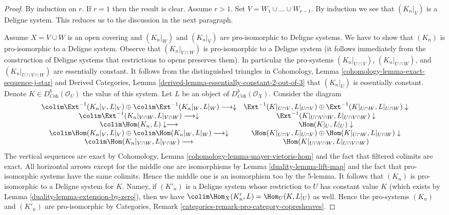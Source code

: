 \begin{proof}

By induction on $r$. If $r = 1$ then the result is clear.
Assume $r > 1$. Set $V = W_1 \cup \ldots \cup W_{r - 1}$.
By induction we see that $(K_n|_V)$ is a Deligne system.
This reduces us to the discussion in the next paragraph.

\medskip\noindent
Assume $X = V \cup W$ is an open covering and
$(K_n|_W)$ and $(K_n|_V)$ are pro-isomorphic to Deligne systems.
We have to show that $(K_n)$ is pro-isomorphic to a Deligne system.
Observe that $(K_n|_{V \cap W})$ is pro-isomorphic to a Deligne system
(it follows immediately from the construction of Deligne systems
that restrictions to opens preserves them). In particular the pro-systems
$(K_n|_{U \cap V})$,
$(K_n|_{U \cap W})$, and
$(K_n|_{U \cap V \cap W})$
are essentially constant. It follows from the distinguished triangles
in Cohomology, Lemma \ref{cohomology-lemma-exact-sequence-j-star} and
Derived Categories, Lemma \ref{derived-lemma-essentially-constant-2-out-of-3}
that $(K_n|_U)$ is essentially constant.
Denote $K \in D^b_{\textit{Coh}}(\mathcal{O}_U)$ the value of this system.
Let $L$ be an object of $D^b_{\textit{Coh}}(\mathcal{O}_X)$.
Consider the diagram
$$
\begin{array}{cc}\colim \Ext^{-1}(K_n|_V, L|_V) \oplus
\colim \Ext^{-1}(K_n|_W, L|_W) \longrightarrow\downarrow & \Ext^{-1}(K|_{U \cap V}, L|_{U \cap V}) \oplus
\Ext^{-1}(K|_{U \cap W}, L|_{U \cap W}) \downarrow \\ \colim \Ext^{-1}(K_n|_{V \cap W}, L|_{V \cap W}) \longrightarrow\downarrow & \Ext^{-1}(K|_{U \cap V \cap W}, L|_{U \cap V \cap W}) \downarrow \\ \colim \Hom(K_n, L) \downarrow\longrightarrow & \Hom(K|_U, L|_U) \downarrow \\ \colim \Hom(K_n|_V, L|_V) \oplus \colim \Hom(K_n|_W, L|_W) \longrightarrow\downarrow & \Hom(K|_{U \cap V}, L|_{U \cap V}) \oplus
\Hom(K|_{U \cap W}, L|_{U \cap W}) \downarrow \\ \colim \Hom(K_n|_{V \cap W}, L|_{V \cap W}) \longrightarrow & \Hom(K|_{U \cap V \cap W}, L|_{U \cap V \cap W})\end{array}
$$
The vertical sequences are exact by
Cohomology, Lemma \ref{cohomology-lemma-mayer-vietoris-hom}
and the fact that filtered colimits are exact.
All horizontal arrows except for the middle one are isomorphisms
by Lemma \ref{duality-lemma-lift-map} and the fact that pro-isomorphic systems
have the same colimits. Hence the middle one is an isomorphism too by
the 5-lemma. It follows that $(K_n)$ is pro-isomorphic to
a Deligne system for $K$. Namey, if $(K'_n)$ is a Deligne system
whose restriction to $U$ has constant value $K$ (which
exists by Lemma \ref{duality-lemma-extension-by-zero}), then
we have $\colim \Hom_X(K'_n, L) = \Hom_U(K, L|_U)$ as well.
Hence the pro-systems $(K_n)$ and $(K'_n)$ are
pro-isomorphic by
Categories, Remark \ref{categories-remark-pro-category-copresheaves}.
\end{proof}

